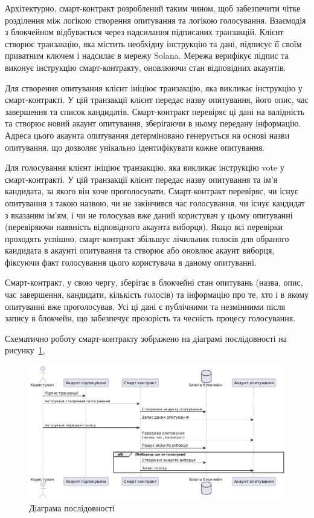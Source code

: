 \documentclass[14pt]{extreport}
\begin{document}
  Архітектурно, смарт-контракт розроблений таким чином, щоб забезпечити чітке розділення між логікою створення опитування та логікою голосування. Взаємодія з блокчейном відбувається через надсилання підписаних транзакцій. Клієнт створює транзакцію, яка містить необхідну інструкцію та дані, підписує її своїм приватним ключем і надсилає в мережу Solana. Мережа верифікує підпис та виконує інструкцію смарт-контракту, оновлюючи стан відповідних акаунтів.

  Для створення опитування клієнт ініціює транзакцію, яка викликає інструкцію у смарт-контракті. У цій транзакції клієнт передає назву опитування, його опис, час завершення та список кандидатів. Смарт-контракт перевіряє ці дані на валідність та створює новий акаунт опитування, зберігаючи в ньому передану інформацію. Адреса цього акаунта опитування детерміновано генерується на основі назви опитування, що дозволяє унікально ідентифікувати кожне опитування.

  Для голосування клієнт ініціює транзакцію, яка викликає інструкцію vote у смарт-контракті. У цій транзакції клієнт передає назву опитування та ім'я кандидата, за якого він хоче проголосувати. Смарт-контракт перевіряє, чи існує опитування з такою назвою, чи не закінчився час голосування, чи існує кандидат з вказаним ім'ям, і чи не голосував вже даний користувач у цьому опитуванні (перевіряючи наявність відповідного акаунта виборця). Якщо всі перевірки проходять успішно, смарт-контракт збільшує лічильник голосів для обраного кандидата в акаунті опитування та створює або оновлює акаунт виборця, фіксуючи факт голосування цього користувача в даному опитуванні.
  
  Смарт-контракт, у свою чергу, зберігає в блокчейні стан опитувань (назва, опис, час завершення, кандидати, кількість голосів) та інформацію про те, хто і в якому опитуванні вже проголосував. Усі ці дані є публічними та незмінними після запису в блокчейн, що забезпечує прозорість та чесність процесу голосування.
  
  Схематично роботу смарт-контракту зображено на діаграмі послідовності на рисунку~\ref{fig:UMLSequence},
  
  \begin{figure}[H]
    \centering
    \includegraphics[scale=0.45]{UMLSequence}
    \caption{Діаграма послідовності}
    \label{fig:UMLSequence}
  \end{figure}
  
\end{document}
